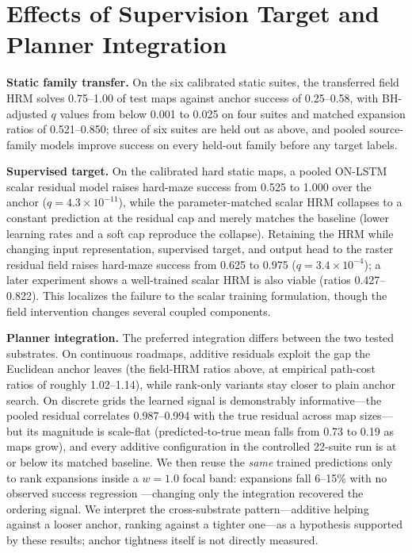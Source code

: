\documentclass[letterpaper]{article} %
\begin{document}
\section{Effects of Supervision Target and Planner Integration}

\textbf{Static family transfer.} On the six calibrated static suites, the transferred field HRM solves 0.75--1.00 of test maps against anchor success of 0.25--0.58, with BH-adjusted $q$ values from below 0.001 to 0.025 on four suites and matched expansion ratios of 0.521--0.850; three of six suites are held out as above, and pooled source-family models improve success on every held-out family before any target labels.

\textbf{Supervised target.} On the calibrated hard static maps, a pooled ON-LSTM scalar residual model raises hard-maze success from 0.525 to 1.000 over the anchor ($q=4.3\times10^{-11}$), while the parameter-matched scalar HRM collapses to a constant prediction at the residual cap and merely matches the baseline (lower learning rates and a soft cap reproduce the collapse). Retaining the HRM while changing input representation, supervised target, and output head to the raster residual field raises hard-maze success from 0.625 to 0.975 ($q=3.4\times10^{-4}$); a later experiment shows a well-trained scalar HRM is also viable (ratios 0.427--0.822). This localizes the failure to the scalar training formulation, though the field intervention changes several coupled components.

\textbf{Planner integration.} The preferred integration differs between the two tested substrates. On continuous roadmaps, additive residuals exploit the gap the Euclidean anchor leaves (the field-HRM ratios above, at empirical path-cost ratios of roughly 1.02--1.14), while rank-only variants stay closer to plain anchor search. On discrete grids the learned signal is demonstrably informative---the pooled residual correlates 0.987--0.994 with the true residual across map sizes---but its magnitude is scale-flat (predicted-to-true mean falls from 0.73 to 0.19 as maps grow), and every additive configuration in the controlled 22-suite run is at or below its matched baseline. We then reuse the \emph{same} trained predictions only to rank expansions inside a $w{=}1.0$ focal band: expansions fall 6--15\% with no observed success regression \citep{chrestien2023rank}---changing only the integration recovered the ordering signal. We interpret the cross-substrate pattern---additive helping against a looser anchor, ranking against a tighter one---as a hypothesis supported by these results; anchor tightness itself is not directly measured.
\end{document}
